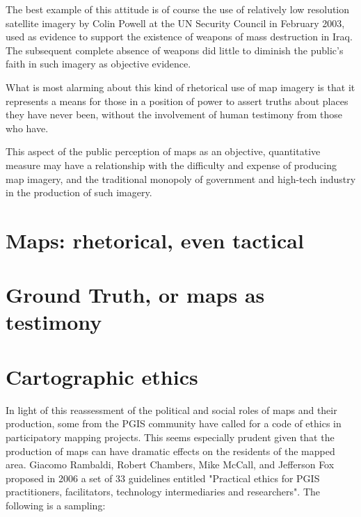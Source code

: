 \documentclass[11pt]{report}
\begin{document}
The best example of this attitude is of course the use of relatively low resolution satellite imagery by Colin Powell at the UN Security Council in February 2003, used as evidence to support the existence of weapons of mass destruction in Iraq. The subsequent complete absence of weapons did little to diminish the public's faith in such imagery as objective evidence. 

What is most alarming about this kind of rhetorical use of map imagery is that it represents a means for those in a position of power to assert truths about places they have never been, without the involvement of human testimony from those who have.

This aspect of the public perception of maps as an objective, quantitative measure may have a relationship with the difficulty and expense of producing map imagery, and the traditional monopoly of government and high-tech industry in the production of such imagery.

\section{Maps: rhetorical, even tactical}
\section{Ground Truth, or maps as testimony}

\section{Cartographic ethics}

In light of this reassessment of the political and social roles of maps and their production, some from the PGIS community have called for a code of ethics in participatory mapping projects. This seems especially prudent given that the production of maps can have dramatic effects on the residents of the mapped area. Giacomo Rambaldi, Robert Chambers, Mike McCall, and Jefferson Fox proposed in 2006 a set of 33 guidelines entitled "Practical ethics for PGIS practitioners, facilitators, technology intermediaries and researchers". The following is a sampling:
\end{document}
